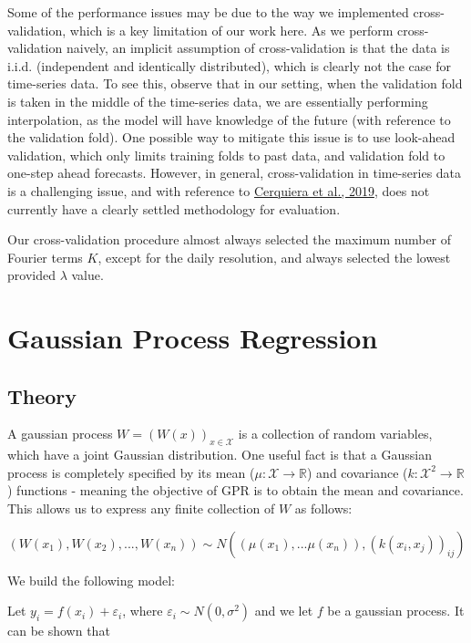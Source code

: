 \documentclass[
]{article}
\begin{document}
Some of the performance issues may be due to the way we implemented
cross-validation, which is a key limitation of our work here. As we
perform cross-validation naively, an implicit assumption of
cross-validation is that the data is i.i.d. (independent and identically
distributed), which is clearly not the case for time-series data. To see
this, observe that in our setting, when the validation fold is taken in
the middle of the time-series data, we are essentially performing
interpolation, as the model will have knowledge of the future (with
reference to the validation fold). One possible way to mitigate this
issue is to use look-ahead validation, which only limits training folds
to past data, and validation fold to one-step ahead forecasts. However,
in general, cross-validation in time-series data is a challenging issue,
and with reference to \href{https://arxiv.org/pdf/1905.11744}{Cerquiera
et al., 2019}, does not currently have a clearly settled methodology for
evaluation.

Our cross-validation procedure almost always selected the maximum number
of Fourier terms \(K\), except for the daily resolution, and always
selected the lowest provided \(\lambda\) value.

\hypertarget{gaussian-process-regression}{%
\section{Gaussian Process
Regression}\label{gaussian-process-regression}}

\hypertarget{theory-1}{%
\subsection{Theory}\label{theory-1}}

A gaussian process \(W = (W(x))_{x \in \mathcal{X}}\) is a collection of
random variables, which have a joint Gaussian distribution. One useful
fact is that a Gaussian process is completely specified by its mean
(\(\mu:\mathcal{X} \rightarrow \mathbb{R}\)) and covariance
(\(k:\mathcal{X}^2 \rightarrow \mathbb{R}\)) functions - meaning the
objective of GPR is to obtain the mean and covariance. This allows us to
express any finite collection of \(W\) as follows:

\[
(W(x_1), W(x_2), ..., W(x_n)) \sim N((\mu(x_1),...\mu(x_n)), (k(x_i,x_j))_{ij})
\]

We build the following model:

Let \(y_i = f(x_i) + \varepsilon_i\), where
\(\varepsilon_i \sim N(0, \sigma^2)\) and we let \(f\) be a gaussian
process. It can be shown that
\end{document}
